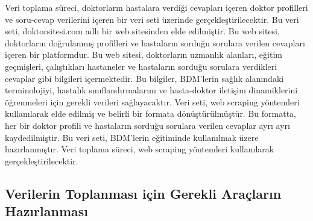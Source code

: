 Veri toplama süreci, doktorların hastalara verdiği cevapları içeren doktor profilleri ve soru-cevap verilerini içeren bir veri seti üzerinde gerçekleştirilecektir. Bu veri seti, doktorsitesi.com adlı bir web sitesinden elde edilmiştir. Bu web sitesi, doktorların doğrulanmış profilleri ve hastaların sorduğu sorulara verilen cevapları içeren bir platformdur. Bu web sitesi, doktorların uzmanlık alanları, eğitim geçmişleri, çalıştıkları hastaneler ve hastaların sorduğu sorulara verdikleri cevaplar gibi bilgileri içermektedir. Bu bilgiler, BDM'lerin sağlık alanındaki terminolojiyi, hastalık sınıflandırmalarını ve hasta-doktor iletişim dinamiklerini öğrenmeleri için gerekli verileri sağlayacaktır. Veri seti, web scraping yöntemleri kullanılarak elde edilmiş ve belirli bir formata dönüştürülmüştür. Bu formatta, her bir doktor profili ve hastaların sorduğu sorulara verilen cevaplar ayrı ayrı kaydedilmiştir. Bu veri seti, BDM'lerin eğitiminde kullanılmak üzere hazırlanmıştır. Veri toplama süreci, web scraping yöntemleri kullanılarak gerçekleştirilecektir.
\subsection{Verilerin Toplanması için Gerekli Araçların Hazırlanması}
